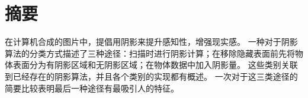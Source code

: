 \section{摘要}
在计算机合成的图片中，提倡用阴影来提升感知性，增强现实感。
一种对于阴影算法的分类方式描述了三种途径：扫描时进行阴影计算；在移除隐藏表面前先将物体表面分为有阴影区域和无阴影区域；在物体数据中加入阴影量。
这些类别关联到已经存在的阴影算法，并且各个类别的实现都有概述。
一次对于这三类途径的简要比较表明最后一种途径有最吸引人的特征。